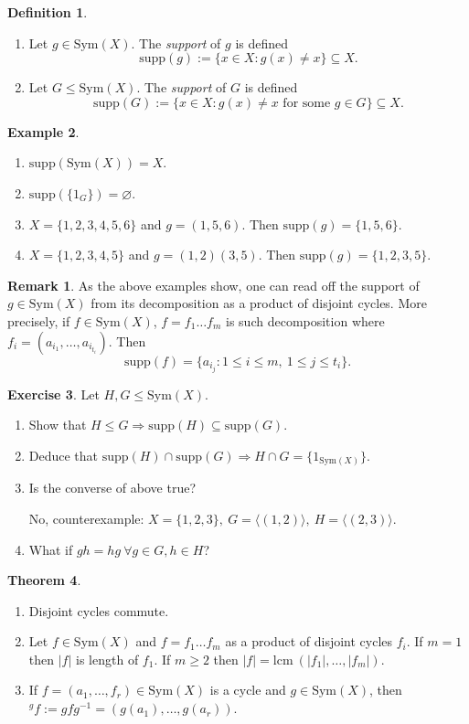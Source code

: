 \documentclass[a4paper]{article}
\newcommand{\Sym}{\text{Sym}}
\newcommand{\supp}{\text{supp}}
\newcommand{\lcm}{\text{lcm}\ }
\theoremstyle{definition}
\newtheorem{defn}{Definition}[subsection]
\newtheorem{thm}[defn]{Theorem}
\newtheorem{example}[defn]{Example}
\newtheorem{exe}[defn]{Exercise}
\newtheorem*{remark}{Remark}
\begin{document}
\begin{defn}
\begin{enumerate}
\item Let $g\in\Sym(X)$. The \textit{support} of $g$ is defined
\[
\supp(g):=\{x\in X:g(x)\neq x\} \subseteq X.
\]
\item Let $G\leq \Sym(X)$. The \textit{support} of $G$ is defined
\[
\supp(G):=\{x\in X:g(x)\neq x\text{ for some }g\in G\} \subseteq X.
\]
\end{enumerate}
\end{defn}
\begin{example}
\begin{enumerate}
\item $\supp(\Sym(X))=X$.
\item $\supp(\{1_G\})=\varnothing$.
\item $X=\{1,2,3,4,5,6\}$ and $g=(1,5,6)$. Then $\supp(g)=\{1,5,6\}$.
\item $X=\{1,2,3,4,5\}$ and $g=(1,2)(3,5)$. Then $\supp(g)=\{1,2,3,5\}$.
\end{enumerate}
\end{example}
\begin{remark}
As the above examples show, one can read off the support of $g\in\Sym(X)$ from its decomposition as a product of disjoint cycles. More precisely, if $f\in\Sym(X)$, $f=f_1\ldots f_m$ is such decomposition where $f_i=\left(a_{i_1},\ldots,a_{i_{t_i}}\right)$. Then
\[
\supp(f)=\{a_{i_j} : 1\leq i\leq m, \ 1\leq j \leq t_i\}.
\]
\end{remark}
\begin{exe}
Let $H,G\leq \Sym(X)$.
\begin{enumerate}
\item Show that $H\leq G\Rightarrow\supp(H)\subseteq\supp(G)$.
\item Deduce that $\supp(H)\cap\supp(G)\Rightarrow H\cap G =\{1_{\Sym(X)}\}$.
\item Is the converse of above true?

No, counterexample: $X=\{1,2,3\},\ G=\langle(1,2)\rangle,\ H=\langle(2,3)\rangle$.
\item What if $gh=hg \ \forall g\in G,h\in H$?
\end{enumerate}
\end{exe}

\begin{thm}
\begin{enumerate}
\item Disjoint cycles commute.
\item Let $f\in\Sym(X)$ and $f=f_1\ldots f_m$ as a product of disjoint cycles $f_i$. If $m=1$ then $|f|$ is length of $f_1$. If $m\geq 2$ then $|f|=\lcm (|f_1|,\ldots,|f_m|)$.
\item If $f=(a_1,\ldots,f_r)\in\Sym(X)$ is a cycle and $g\in\Sym(X)$, then $^gf:=gfg^{-1}=\left(g(a_1),\ldots,g(a_r)\right)$.
\end{enumerate}
\end{thm}
\end{document}
